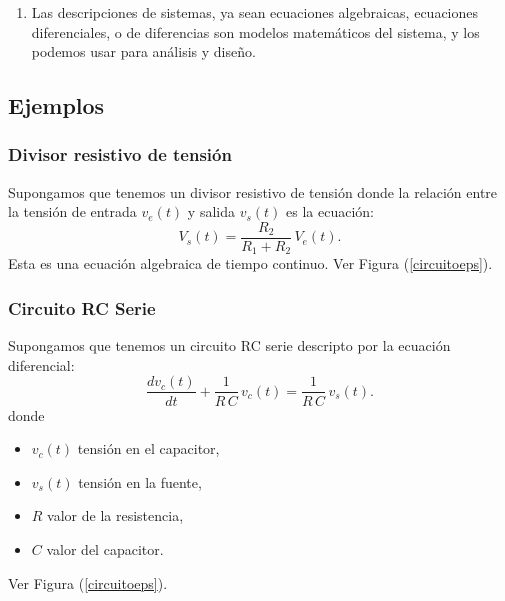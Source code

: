 \documentclass[11pt,a4paper,openany]{book}
\begin{document}
\begin{enumerate}
\begin{enumerate}
		\item Ecuaciones de diferencias finitas donde $x[n]$ es la entrada e $y[n]$ es la salida del sistema. Por ejemplo:
		\begin{equation}
			y[n] - x[n] + x[n-1] - \frac{x[n-1]}{2} - y[n-1] - 2 \, y[n-2] + 4 \, y[n-3] = 0.
		\end{equation}
	\end{enumerate}
	
	\item Las descripciones de sistemas, ya sean ecuaciones algebraicas, ecuaciones diferenciales, o de diferencias son modelos matemáticos del sistema, y los podemos usar para análisis y diseño.
\end{enumerate}

\subsection{Ejemplos}

\subsubsection{Divisor resistivo de tensión}
Supongamos que tenemos un divisor resistivo de tensión donde la relación entre la tensión de entrada $v_{e}(t)$ y salida $v_{s}(t)$ es la ecuación:
\begin{equation}
	V_{s}(t) = \frac{R_{2}}{R_{1} + R_{2}} \, V_{e}(t). \label{divires}
\end{equation}
Esta es una ecuación algebraica de tiempo continuo. Ver Figura (\ref{circuitoeps}).

\subsubsection{Circuito RC Serie}
Supongamos que tenemos un circuito RC serie descripto por la ecuación diferencial:
\begin{equation}
	\frac{dv_{c}(t)}{dt} + \frac{1}{R \, C} \, v_{c}(t) = \frac{1}{R \, C} \, v_{s}(t). \label{rcserie}
\end{equation}
donde
\begin{itemize}
	\item $v_{c}(t)$ tensión en el capacitor,
	\item $v_{s}(t)$ tensión en la fuente,
	\item $R$ valor de la resistencia,
	\item $C$ valor del capacitor.
\end{itemize}
Ver Figura (\ref{circuitoeps}).
\end{document}
